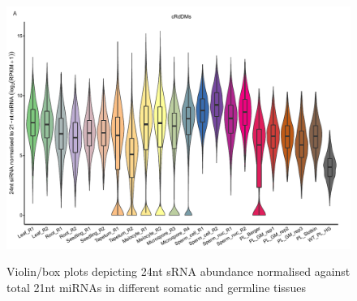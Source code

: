 \begin{figure}[htbp!] 
\centering    
    \includegraphics[width=1\textwidth]{Chapter2/Figs/Supps/FigureS7_miRNA_norm.pdf}
\caption{Violin/box plots depicting 24nt sRNA abundance normalised against total 21nt miRNAs in different somatic and germline tissues}
\label{fig:miRNA_norm}
\captionsetup{font=small}
    \caption*{}
\end{figure}

